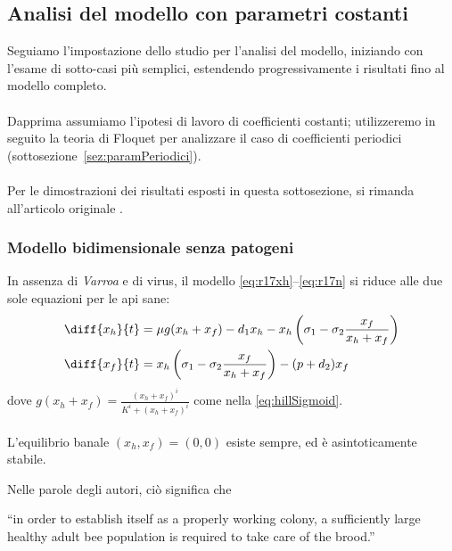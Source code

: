 \subsection{Analisi del modello con parametri costanti}
Seguiamo l'impostazione dello studio \cite{ratti2017} per l'analisi del modello, iniziando con l'esame di sotto-casi più semplici, estendendo progressivamente i risultati fino al modello completo.

\paragraph{}
Dapprima assumiamo l'ipotesi di lavoro di coefficienti costanti; utilizzeremo in seguito la teoria di Floquet per analizzare il caso di coefficienti periodici (sottosezione~\ref{sez:paramPeriodici}).

\paragraph{}
Per le dimostrazioni dei risultati esposti in questa sottosezione, si rimanda all'articolo originale \cite[11--15]{ratti2017}.

\subsubsection{Modello bidimensionale senza patogeni}
In assenza di \emph{Varroa} e di virus, il modello \eqref{eq:r17xh}--\eqref{eq:r17n} si riduce alle due sole equazioni per le api sane:
\begin{align}
    \diff{x_h}{t} &= \mu g( x_h + x_f ) - d_1 x_h - x_h \left( \sigma_1 - \sigma_2 \frac{x_f}{x_h + x_f} \right)
    \label{eq:rattiRidotto1prima}
    \\
    \diff{x_f}{t} &= x_h \left( \sigma_1 - \sigma_2 \frac{x_f}{x_h + x_f} \right) - (p + d_2) x_f
    \label{eq:rattiRidotto1seconda}
\end{align}
dove $g(x_h + x_f) = \frac{ (x_h+x_f)^i }{ K^i + (x_h+x_f)^i }$ come nella \eqref{eq:hillSigmoid}.

\paragraph{}
L'equilibrio banale $(x_h, x_f) = (0,0)$ esiste sempre, ed è asintoticamente stabile.

Nelle parole degli autori, ciò significa che
\begin{displayquote}
``\omissis in order to establish itself as a properly working colony, a sufficiently large healthy adult bee population is required to take care of the brood.''
\end{displayquote}

